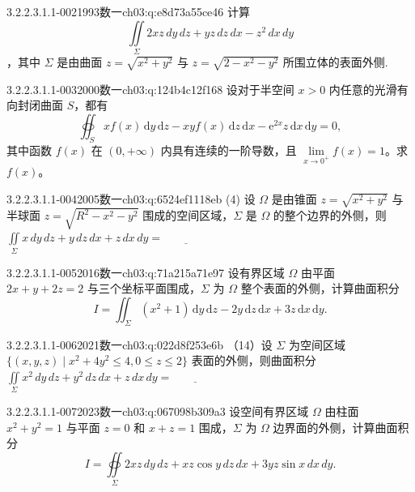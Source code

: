 \begin{q}{3.2.2.3.1.1-002}{1993数一}{ch03:q:e8d73a55ce46}
计算 \[\iint\limits_{\Sigma} 2xz\,dy\,dz + yz\,dz\,dx - z^2\,dx\,dy\]，其中 $\Sigma$ 是由曲面 $z=\sqrt{x^2+y^2}$ 与 $z=\sqrt{2-x^2-y^2}$ 所围立体的表面外侧.
\end{q}

\begin{q}{3.2.2.3.1.1-003}{2000数一}{ch03:q:124b4c12f168}
设对于半空间 $x>0$ 内任意的光滑有向封闭曲面 $S$，都有
\[\oiint_{S} xf(x)\,\mathrm{d}y\,\mathrm{d}z-xyf(x)\,\mathrm{d}z\,\mathrm{d}x-\mathrm{e}^{2x}z\,\mathrm{d}x\,\mathrm{d}y=0,\]
其中函数 $f(x)$ 在 $(0,+\infty)$ 内具有连续的一阶导数，且 $\displaystyle \lim\limits_{x\to 0^{+}}f(x)=1$。求 $f(x)$。
\end{q}

\begin{q}{3.2.2.3.1.1-004}{2005数一}{ch03:q:6524ef1118eb}
(4) 设 $\Omega$ 是由锥面 $z=\sqrt{x^2+y^2}$ 与半球面 $z=\sqrt{R^2-x^2-y^2}$ 围成的空间区域，$\Sigma$ 是 $\Omega$ 的整个边界的外侧，则
$\displaystyle \iint\limits_{\Sigma} x\,dy\,dz+y\,dz\,dx+z\,dx\,dy=\underline{\hspace{4em}}$
\end{q}

\begin{q}{3.2.2.3.1.1-005}{2016数一}{ch03:q:71a215a71e97}
设有界区域 $\Omega$ 由平面 $2x+y+2z=2$ 与三个坐标平面围成，$\Sigma$ 为 $\Omega$ 整个表面的外侧，计算曲面积分
\[ I=\iint_{\Sigma}(x^2+1)\,\mathrm{d}y\,\mathrm{d}z-2y\,\mathrm{d}z\,\mathrm{d}x+3z\,\mathrm{d}x\,\mathrm{d}y. \]
\end{q}

\begin{q}{3.2.2.3.1.1-006}{2021数一}{ch03:q:022d8f253e6b}
（14）设 $\Sigma$ 为空间区域 $\{(x,y,z)\mid x^2+4y^2\leqslant 4,0\leqslant z\leqslant 2\}$ 表面的外侧，则曲面积分
$\displaystyle \iint\limits_{\Sigma} x^2\,dy\,dz+y^2\,dz\,dx+z\,dx\,dy=\underline{\hspace{4em}}$
\end{q}

\begin{q}{3.2.2.3.1.1-007}{2023数一}{ch03:q:067098b309a3}
设空间有界区域 $\Omega$ 由柱面 $x^2+y^2=1$ 与平面 $z=0$ 和 $x+z=1$ 围成，$\Sigma$ 为 $\Omega$ 边界面的外侧，计算曲面积分
\[I=\oiint\limits_{\Sigma} 2xz\,dy\,dz+xz\cos y\,dz\,dx+3yz\sin x\,dx\,dy.\]
\end{q}

